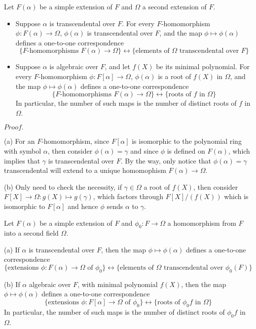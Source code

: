 \documentclass{article}
\newcommand{\Pf}[1]{$Proof.$\par}
\begin{document}
\begin{proposition}
    Let $F(\alpha)$ be a simple extension of $F$ and $\Omega$ a second extension of $F$.\par
    \begin{itemize}
        \item Suppose $\alpha$ is transcendental over $F$. For every $F$-homomorphism $\phi:F(\alpha) \to \Omega$, $\phi(\alpha)$ is transcendental over $F$, and the map $\phi\mapsto \phi(\alpha)$ defines a one-to-one correspondence
        \[\{F\text{-homomorphisms } F(\alpha) \to \Omega \}\leftrightarrow \{\text{elements of } \Omega \text{ transcendental over }F\}\]
        \item Suppose $\alpha$ is algebraic over $F$, and let $f(X)$ be its minimal polynomial. For every $F$-homomorphism $\phi:F[\alpha]\to \Omega$, $\phi(\alpha)$ is a root of $f(X)$ in $\Omega$, and the map $\phi \mapsto \phi(\alpha)$ defines a one-to-one correspondence
        \[\{F\text{-homomorphisms } F(\alpha) \to \Omega \}\leftrightarrow \{\text{roots of } f \text{ in }\Omega\}\]
        In particular, the number of such maps is the number of distinct roots of $f$ in $\Omega$.
    \end{itemize}
\end{proposition}
\Pf\par
    (a) For an $F$-homomorphism, since $F[\alpha]$ is isomorphic to the polynomial ring with symbol $\alpha$, then consider $\phi(\alpha) = \gamma$ and since $\phi$ is defined on $F(\alpha)$, which implies that $\gamma$ is transcendental over $F$. By the way, only notice that $\phi(\alpha) = \gamma$ transcendental will extend to a unique homomophism $F(\alpha) \to \Omega$.\par
    (b) Only need to check the necessity, if $\gamma \in \Omega$ a root of $f(X)$, then consider $F[X] \to \Omega: g(X) \mapsto g(\gamma)$, which factors through $F[X]/(f(X))$ which is isomorphic to $F[\alpha]$ and hence $\phi$ sends $\alpha$ to $\gamma$.

\begin{proposition}
        Let $F(\alpha)$ be a simple extension of $F$ and $\phi_0:F\to \Omega$ a homomorphism from $F$ into a second field $\Omega$.\par
    (a) If $\alpha$ is transcendental over $F$, then the map $\phi \mapsto \phi(\alpha)$ defines a one-to-one correspondence
    \[
    \{\text{extensions }\phi:F(\alpha) \to \Omega\text{ of }\phi_0\} \leftrightarrow \{\text{elements of }\Omega\text{ transcendental over }\phi_0(F)\}
    \]\par
    (b) If $\alpha$ algebraic over $F$, with minimal polynomial $f(X)$, then the map $\phi \mapsto \phi(\alpha)$ defines a one-to-one correspondence
    \[
    \{\text{extensions }\phi:F[\alpha] \to \Omega\text{ of }\phi_0\} \leftrightarrow \{\text{roots of }\phi_0f\text{ in }\Omega\}
    \]
    In particular, the number of such maps is the number of distinct roots of $\phi_0f$ in $\Omega$. 
\end{proposition}
    
\end{document}
